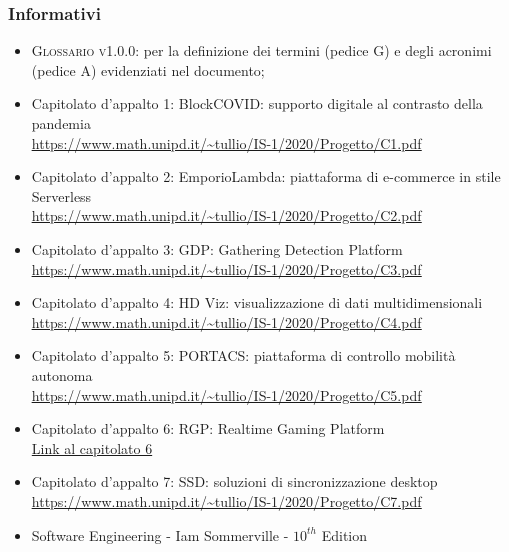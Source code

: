 \subsubsection{Informativi}
\begin{itemize}
	\item \textsc{Glossario v1.0.0}: per la definizione dei termini (pedice G) e degli acronimi (pedice A) evidenziati nel documento;
	\item Capitolato d'appalto 1: BlockCOVID: supporto digitale al contrasto della pandemia\\
	\uline{\url{https://www.math.unipd.it/~tullio/IS-1/2020/Progetto/C1.pdf}}
	\item Capitolato d'appalto 2: EmporioLambda: piattaforma di e-commerce in stile Serverless\\
	\uline{\url{https://www.math.unipd.it/~tullio/IS-1/2020/Progetto/C2.pdf}}
	\item Capitolato d'appalto 3: GDP: Gathering Detection Platform\\
	\uline{\url{https://www.math.unipd.it/~tullio/IS-1/2020/Progetto/C3.pdf}}
	\item Capitolato d'appalto 4: HD Viz: visualizzazione di dati multidimensionali\\
	\uline{\url{https://www.math.unipd.it/~tullio/IS-1/2020/Progetto/C4.pdf}}
	\item Capitolato d'appalto 5: PORTACS: piattaforma di controllo mobilità autonoma\\
	\uline{\url{https://www.math.unipd.it/~tullio/IS-1/2020/Progetto/C5.pdf}}
	\item Capitolato d'appalto 6: RGP: Realtime Gaming Platform\\
 \href{https://sesaspa-my.sharepoint.com/personal/s_dindo_vargroup_it/_layouts/15/onedrive.aspx?id=%2Fpersonal%2Fs%5Fdindo%5Fvargroup%5Fit%2FDocuments%2FDownload%2Fupload%2FIngegneria%5Fsoftware%2FCapitolato%5FIngegneria%5Fsoftware%2Epdf&parent=%2Fpersonal%2Fs%5Fdindo%5Fvargroup%5Fit%2FDocuments%2FDownload%2Fupload%2FIngegneria%5Fsoftware&originalPath=aHR0cHM6Ly9zZXNhc3BhLW15LnNoYXJlcG9pbnQuY29tLzpiOi9nL3BlcnNvbmFsL3NfZGluZG9fdmFyZ3JvdXBfaXQvRVRodmF5MGY2S1ZDb1h5ZFlPY2UybGtCdC1NWWNuVzF5YWZSWEZYVklPSXNIZz9ydGltZT05VUwxNldDejJFZw}{Link al capitolato 6}
	\item Capitolato d'appalto 7: SSD: soluzioni di sincronizzazione desktop\\
	\uline{\url{https://www.math.unipd.it/~tullio/IS-1/2020/Progetto/C7.pdf}}
	\item Software Engineering - Iam Sommerville - $10^{th}$ Edition
\end{itemize}	